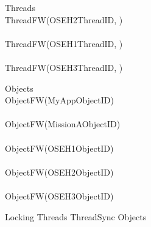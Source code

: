 %
\begin{circus}
\circprocess Threads \circdef  \\
\circblockopen
ThreadFW(OSEH2ThreadID, ) \\
\interleave \\
ThreadFW(OSEH1ThreadID, ) \\
\interleave \\
ThreadFW(OSEH3ThreadID, ) \\

\circblockclose
\end{circus}
%
%
\begin{circus}
\circprocess Objects \circdef \\
\circblockopen
ObjectFW(MyAppObjectID) \\
\interleave \\
ObjectFW(MissionAObjectID) \\
\interleave \\
ObjectFW(OSEH1ObjectID) \\
\interleave \\
ObjectFW(OSEH2ObjectID) \\
\interleave \\
ObjectFW(OSEH3ObjectID) \\

\circblockclose
\end{circus}
%
%
\begin{circus}
\circprocess Locking \circdef Threads \lpar ThreadSync \rpar Objects
\end{circus}
